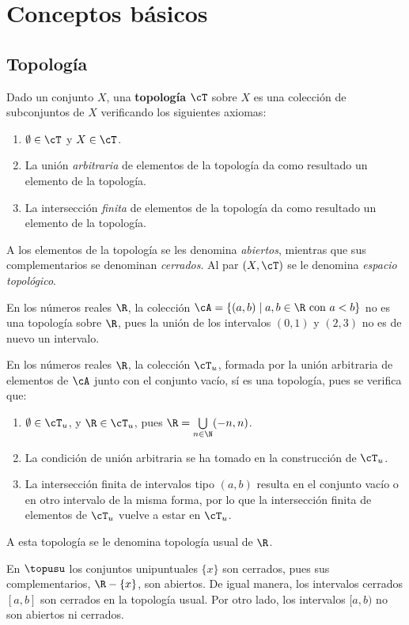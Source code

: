 \section*{Conceptos básicos}

\subsection*{Topología}

\begin{deff}
    Dado un conjunto $X$, una {\bf topología} $\cT$ sobre $X$ es una colección de subconjuntos de $X$ verificando los siguientes axiomas:

    \begin{enumerate}[leftmargin=15pt,itemsep=0pt, topsep=5pt]
        \item $\emptyset \in \cT$ y $X \in \cT$.
        \item La unión {\it arbitraria} de elementos de la topología da como resultado un elemento de la topología.
        \item La intersección {\it finita} de elementos de la topología da como resultado un elemento de la topología.
    \end{enumerate}
\end{deff}

A los elementos de la topología se les denomina {\it abiertos}, mientras que sus complementarios se denominan \textit{cerrados}. Al par $(X,\cT)$ se le denomina {\it espacio topológico}.

\begin{ejs}
    \item En los números reales $\R$, la colección $\cA = \{(a,b) \mid a,b \in \R \text{ con } a < b\}$ no es una topología sobre $\R$, pues la unión de los intervalos $(0,1)$ y $(2,3)$ no es de nuevo un intervalo.
    \item En los números reales $\R$, la colección $\cT_u$, formada por la unión arbitraria de elementos de $\cA$ junto con el conjunto vacío, sí es una topología, pues se verifica que:
    \begin{enumerate}[itemsep=0pt]
        \item $\emptyset \in \cT_u$, y $\R\in\cT_u$, pues $\R = \bigcup\limits_{n \in \N}(-n,n)$.
        \item La condición de unión arbitraria se ha tomado en la construcción de $\cT_u$.
        \item La intersección finita de intervalos tipo $(a,b)$ resulta en el conjunto vacío o en otro intervalo de la misma forma, por lo que la intersección finita de elementos de $\cT_u$ vuelve a estar en $\cT_u$.
    \end{enumerate}
    A esta topología se le denomina topología usual de $\R$.
    \item En $\topusu$ los conjuntos unipuntuales $\{x\}$ son cerrados, pues sus complementarios, $\R - \{x\}$, son abiertos. De igual manera, los intervalos cerrados $[a,b]$ son cerrados en la topología usual. Por otro lado, los intervalos $[a,b)$ no son abiertos ni cerrados.
\end{ejs}


